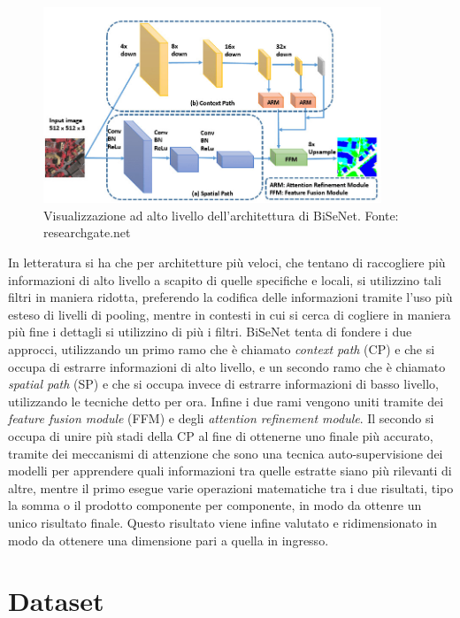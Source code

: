 \begin{figure}
    \center
    \includegraphics[width=0.9\textwidth]{./assets/bisenet.jpg}
    \caption{\label{fig:bisenet}Visualizzazione ad alto livello dell'architettura di BiSeNet. Fonte: researchgate.net}
\end{figure}

In letteratura si ha che per architetture più veloci, che tentano
di raccogliere più informazioni di alto livello a scapito di quelle
specifiche e locali, si utilizzino tali filtri in maniera ridotta,
preferendo la codifica delle informazioni tramite l'uso più esteso
di livelli di pooling, mentre in contesti in cui si cerca di
cogliere in maniera più fine i dettagli si utilizzino di più i filtri.
BiSeNet tenta di fondere i due approcci, utilizzando un primo ramo
che è chiamato {\it context path} (CP) e che si occupa di estrarre
informazioni di alto livello, e un secondo ramo che è chiamato
{\it spatial path} (SP) e che si occupa invece di estrarre informazioni
di basso livello, utilizzando le tecniche detto per ora.
Infine i due rami vengono uniti tramite dei
{\it feature fusion module} (FFM) e degli
{\it attention refinement module}.
Il secondo si occupa di unire più stadi della CP al fine di ottenerne
uno finale più accurato, tramite dei meccanismi di attenzione che sono
una tecnica auto-supervisione dei modelli per apprendere quali 
informazioni tra quelle estratte siano più rilevanti di altre,
mentre il primo esegue varie operazioni matematiche tra i due
risultati, tipo la somma o il prodotto componente per componente, 
in modo da ottenre un unico risultato finale.
Questo risultato viene infine valutato e ridimensionato in modo
da ottenere una dimensione pari a quella in ingresso.



\section{\label{sec:Dataset}Dataset}

